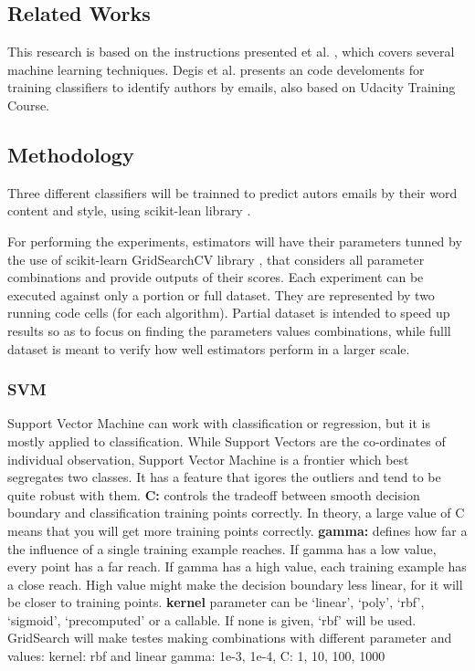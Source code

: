 \documentclass[11pt]{article}
\begin{document}
\begin{multicols}{2}
    \subsection{Related Works}\label{related-works}

This research is based on the instructions presented et al.
\cite{Udacity}, which covers several machine learning techniques. Degis
et al. \cite{mdegis} presents an code develoments for training
classifiers to identify authors by emails, also based on Udacity
Training Course.

    \subsection{Methodology}\label{methodology}

Three different classifiers will be trainned to predict autors emails by
their word content and style, using scikit-lean library \cite{scikit}.

For performing the experiments, estimators will have their parameters
tunned by the use of scikit-learn GridSearchCV library \cite{gsearch},
that considers all parameter combinations and provide outputs of their
scores. Each experiment can be executed against only a portion or full
dataset. They are represented by two running code cells (for each
algorithm). Partial dataset is intended to speed up results so as to
focus on finding the parameters values combinations, while fulll dataset
is meant to verify how well estimators perform in a larger scale.

    \subsubsection{SVM}\label{svm}

Support Vector Machine can work with classification or regression, but
it is mostly applied to classification. While Support Vectors are the
co-ordinates of individual observation, Support Vector Machine is a
frontier which best segregates two classes. It has a feature that igores
the outliers and tend to be quite robust with them. \textbf{C:} controls
the tradeoff between smooth decision boundary and classification
training points correctly. In theory, a large value of C means that you
will get more training points correctly. \textbf{gamma:} defines how far
a the influence of a single training example reaches. If gamma has a low
value, every point has a far reach. If gamma has a high value, each
training example has a close reach. High value might make the decision
boundary less linear, for it will be closer to training points.
\textbf{kernel} parameter can be `linear', `poly', `rbf', `sigmoid',
`precomputed' or a callable. If none is given, `rbf' will be used.
GridSearch will make testes making combinations with different parameter
and values: kernel: rbf and linear gamma: 1e-3, 1e-4, C: 1, 10, 100,
1000


\end{multicols}
\end{document}
